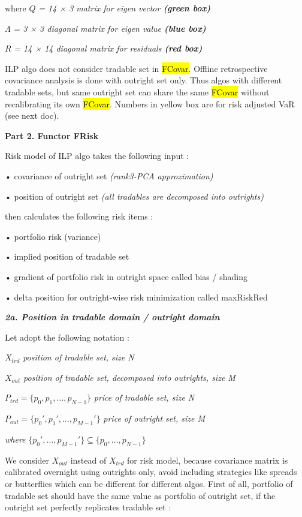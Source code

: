 where \(Q\) \emph{= 14 × 3 matrix for eigen vector \textbf{(green box)}}

\(\Lambda\) \emph{= 3 × 3 diagonal matrix for eigen value \textbf{(blue
box)}}

\(R\) \emph{= 14 × 14 diagonal matrix for residuals \textbf{(red box)}}

ILP algo does not consider tradable set in \hl{FCovar}. Offline
retrospective covariance analysis is done with outright set only. Thus
algos with different tradable sets, but same outright set can share the
same \hl{FCovar} without recalibrating its own \hl{FCovar}. Numbers in
yellow box are for risk adjusted VaR (see next doc).

\textbf{Part 2. Functor FRisk}

Risk model of ILP algo takes the following input :

• covariance of outright set \emph{(rank3-PCA approximation)}

• position of outright set \emph{(all tradables are decomposed into
outrights)}

then calculates the following risk items :

• portfolio risk (variance)

• implied position of tradable set

• gradient of portfolio risk in outright space called bias / shading

• delta position for outright-wise risk minimization called maxRiskRed

\emph{\textbf{2a. Position in tradable domain / outright domain}}

Let adopt the following notation :

\(X_{trd}\) \emph{position of tradable set, size N}

\(X_{out}\) \emph{position of tradable set, decomposed into outrights,
size M}

\(P_{trd} = \{ p_{0},p_{1},\ldots,p_{N - 1}\}\) \emph{price of tradable
set, size N}

\(P_{out} = \{ p_{0}',p_{1}',\ldots,p_{M - 1}'\}\) \emph{price of
outright set, size M}

\emph{where}
\(\{ p_{0}',\ldots,p_{M - 1}'\} \subseteq \{ p_{0},\ldots,p_{N - 1}\}\)

We consider \(X_{out}\) instead of \(X_{trd}\) for risk model, because
covariance matrix is calibrated overnight using outrights only, avoid
including strategies like spreads or butterflies which can be different
for different algos. First of all, portfolio of tradable set should have
the same value as portfolio of outright set, if the outright set
perfectly replicates tradable set :

